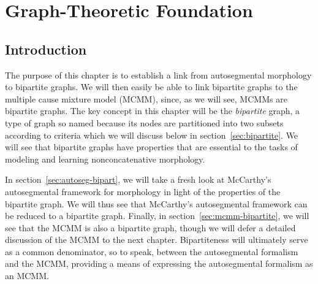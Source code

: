 \chapter{Graph-Theoretic Foundation}
\label{ch:graph}
\section{Introduction}
The purpose of this chapter is to
establish a link from autosegmental morphology to bipartite graphs. We will then easily be
able to link bipartite graphs to the multiple cause mixture model (MCMM), since, as we will see,
MCMMs are bipartite graphs.
The key concept in this chapter will be the \emph{bipartite} graph, 
a type of graph so named because its nodes are partitioned into two subsets according 
to criteria which we will discuss below in section~\ref{sec:bipartite}. 
We will see that bipartite graphs have properties that are essential 
to the tasks of modeling and learning nonconcatenative morphology.

In section~\ref{sec:autoseg-bipart}, we will take a fresh look at McCarthy's 
autosegmental framework for morphology \citep{mccarthy:1981} in light of the 
properties of the bipartite graph. We will thus see that 
McCarthy's 
autosegmental framework can be reduced to a bipartite graph.
Finally, in section~\ref{sec:mcmm-bipartite}, we will see that the \ac{MCMM} is also a bipartite graph,
though we will defer a detailed discussion of the MCMM to the next chapter.
Bipartiteness will ultimately serve as a common denominator, so to speak, between the autosegmental formalism and the MCMM, providing a means of expressing the autosegmental formalism as an MCMM.
 
